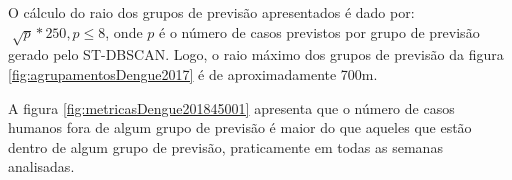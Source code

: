 \begin{figure}[!ht]
	\centering
\end{figure}
\FloatBarrier

O cálculo do raio dos grupos de previsão apresentados é dado por:
${\sqrt[]{p} * 250, p \leqslant 8}$, onde ${p}$ é o número de casos previstos por grupo de previsão gerado pelo ST-DBSCAN. Logo, o raio máximo dos grupos de previsão da figura \ref{fig:agrupamentosDengue2017} é de aproximadamente 700m.

A figura \ref{fig:metricasDengue201845001} apresenta que o número de casos humanos fora de algum grupo de previsão é maior do que aqueles que estão dentro de algum grupo de previsão, praticamente em todas as semanas analisadas.
\begin{figure}[!ht]
	\centering	
\end{figure}
\FloatBarrier

